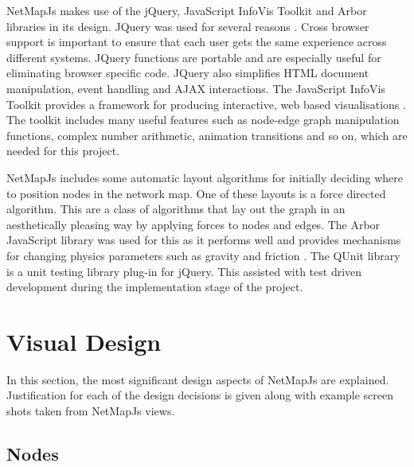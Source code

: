 \documentclass[11pt, a4paper]{article}
\begin{document}
NetMapJs makes use of the jQuery, JavaScript InfoVis Toolkit and Arbor libraries
in its design. JQuery was used for several reasons \cite{jQuery_website}. Cross
browser support is important to ensure that each user gets the same experience
across different systems. JQuery functions are portable and are especially
useful for eliminating browser specific code. JQuery also simplifies HTML
document manipulation, event handling and AJAX interactions. The JavaScript
InfoVis Toolkit provides a framework for producing interactive, web based
visualisations \cite{thejit_website}. The toolkit includes many useful features
such as node-edge graph manipulation functions, complex number arithmetic,
animation transitions and so on, which are needed for this project.

NetMapJs includes some automatic layout algorithms for initially deciding where
to position nodes in the network map. One of these layouts is a force directed
algorithm. This are a class of algorithms that lay out the graph in an
aesthetically pleasing way by applying forces to nodes and edges. The Arbor
JavaScript library was used for this as it performs well and provides mechanisms
for changing physics parameters such as gravity and friction
\cite{Arbor_website}. The QUnit library is a unit testing library plug-in for
jQuery. This assisted with test driven development during the implementation
stage of the project.

\newpage

\section{Visual Design} 
\label{sec:visual-design}

In this section, the most significant design aspects of NetMapJs are explained.
Justification for each of the design decisions is given along with example
screen shots taken from NetMapJs views.

\subsection{Nodes}
\label{sec:nodes.vis}

\end{document}
